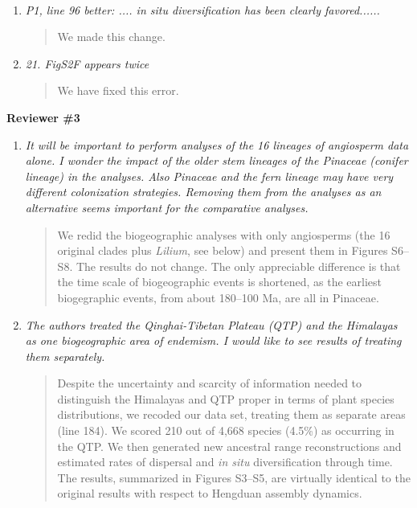 \documentclass[11pt]{letter}
\begin{document}
\begin{letter}{ \\

}
\begin{enumerate}
  \begin{quote}
    We made this change.
  \end{quote}

\item \textit{P1, line 96 better: .... in situ diversification has
    been clearly favored......}

  \begin{quote}
    We made this change.
  \end{quote}

\item \textit{21. FigS2F appears twice}

  \begin{quote}
    We have fixed this error.
  \end{quote}

\end{enumerate}


\textbf{Reviewer \#3}

\begin{enumerate}

\item \textit{It will be important to perform analyses of the 16
    lineages of angiosperm data alone. I wonder the impact of the
    older stem lineages of the Pinaceae (conifer lineage) in the
    analyses. Also Pinaceae and the fern lineage may have very
    different colonization strategies. Removing them from the analyses
    as an alternative seems important for the comparative analyses.}

  \begin{quote}
    We redid the biogeographic analyses with only angiosperms (the 16
    original clades plus \textit{Lilium}, see below) and present them
    in Figures S6--S8. The results do not change. The only appreciable
    difference is that the time scale of biogeographic events is
    shortened, as the earliest biogegraphic events, from about
    180--100 Ma, are all in Pinaceae.
  \end{quote}

\item \textit{The authors treated the Qinghai-Tibetan Plateau (QTP)
    and the Himalayas as one biogeographic area of endemism. I would
    like to see results of treating them separately.}

  \begin{quote}
    Despite the uncertainty and scarcity of information needed to
    distinguish the Himalayas and QTP proper in terms of plant species
    distributions, we recoded our data set, treating them as separate
    areas (line 184). We scored 210 out of 4,668 species (4.5\%) as
    occurring in the QTP. We then generated new ancestral range
    reconstructions and estimated rates of dispersal and \textit{in
      situ} diversification through time. The results, summarized in
    Figures S3--S5, are virtually identical to the original results
    with respect to Hengduan assembly dynamics.
  \end{quote}


\end{enumerate}
\end{letter}
\end{document}
